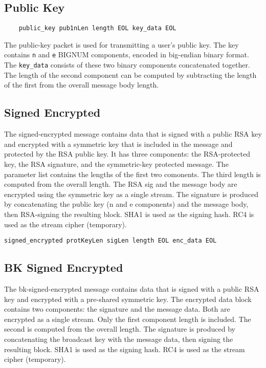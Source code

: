 \documentclass[letterpaper,11pt,oneside]{article}
\begin{document}
\subsection{Public Key}

\vspace{10pt}
\begin{verbatim}
    public_key pub1nLen length EOL key_data EOL
\end{verbatim}
\vspace{10pt}

The public-key packet is used for transmitting a user's public key. The key
contains \verb|n| and \verb|e| BIGNUM components, encoded in big-endian binary
format. The \verb|key_data| consists of these two binary components
concatenated together. The length of the second component can be computed by
subtracting the length of the first from the overall message body length.

\subsection{Signed Encrypted}

The signed-encrypted message contains data that is signed with a public RSA key
and encrypted with a symmetric key that is included in the message and
protected by the RSA public key. It has three components: the RSA-protected
key, the RSA signature, and the symmetric-key protected message. The parameter
list contains the lengths of the first two comonents. The third length is
computed from the overall length. The RSA sig and the message body are
encrypted using the symmetric key as a single stream. The signature is produced
by concatenating the public key (n and e components) and the message body, then
RSA-signing the resulting block. SHA1 is used as the signing hash. RC4 is used
as the stream cipher (temporary).

\vspace{10pt}
\begin{verbatim}
signed_encrypted protKeyLen sigLen length EOL enc_data EOL
\end{verbatim}
\vspace{10pt}

\subsection{BK Signed Encrypted}

The bk-signed-encrypted message contains data that is signed with a public RSA
key and encrypted with a pre-shared symmetric key. The encrypted data block
contains two components: the signature and the message data. Both are encrypted
as a single stream. Only the first component length is included. The second is
computed from the overall length. The signature is produced by concatenating
the broadcast key with the message data, then signing the resulting block. SHA1
is used as the signing hash. RC4 is used as the stream cipher (temporary).
\end{document}
